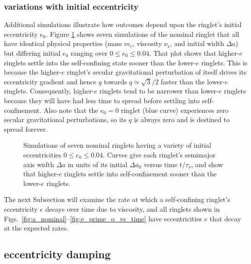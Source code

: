 \documentclass[preprint]{aastex62}
\begin{document}
\subsubsection{variations with initial eccentricity}
\label{subsec:e-variations}

Additional simulations illustrate how outcomes depend upon the ringlet's initial eccentricity $e_0$.
Figure \ref{fig:e0} shows seven simulations of the nominal ringlet that all have identical
physical properties (mass $m_r$, viscosity $\nu_s$, and initial width $\Delta a$) but differing initial $e_0$ ranging
over $0\le e_0\le 0.04$. That plot shows that higher-$e$ ringlets settle into the
self-confining state sooner than the lower-$e$ ringlets. This is because the higher-$e$ ringlet's
secular gravitational perturbation of itself drives its eccentricity gradient and hence $q$ towards 
$q\simeq\sqrt{3}/2$ faster than the lower-$e$ ringlets. Consequently, 
higher-$e$ ringlets tend to be narrower than lower-$e$ ringlets because they will have had
less time to spread before settling into self-confinement. Also note that the $e_0=0$ ringlet
(blue curve) experiences zero secular gravitational perturbations, so its $q$ is always zero
and is destined to spread forever.

\begin{figure}
    \caption{
        \label{fig:e0}
        Simulations of seven nominal ringlets having a variety of initial eccentricities $0\le e_0\le 0.04$.
        Curves give each ringlet's semimajor axis width $\Delta a$ in units of its initial $\Delta a_0$
        versus time $t/\tau_\nu$, and show that higher-$e$ ringlets settle into self-confinement
        sooner than the lower-$e$ ringlets.
    }
\end{figure}

The next Subsection will examine the rate at which
a self-confining ringlet's eccentricity $e$ decays over time due to viscosity, 
and all ringlets shown in Figs.\ \ref{fig:a_nominal}--\ref{fig:e_prime_q_vs_time}
have eccentricities $e$ that decay at the expected rates.


\subsection{eccentricity damping}
\label{subsec:eccentricity}
\end{document}
